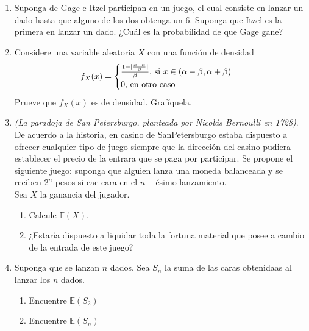 \documentclass[12pt,a4paper]{report}
\begin{document}
	\begin{enumerate}
		\item{
			Suponga de Gage e Itzel participan en un juego, el cual consiste en
			lanzar un dado hasta que alguno de los dos obtenga un 6. Suponga
			que Itzel es la primera en lanzar un dado. ¿Cuál es la probabilidad
			de que Gage gane?
		}

		\item{
			Considere una variable aleatoria $X$ con una función de densidad
			\[
				f_X(x) = \begin{cases}
					\frac{1-|\frac{x-\alpha}{\beta}|}{\beta},
					$ si $ x \in (\alpha - \beta, \alpha + \beta)\\
					0, $ en otro caso$
				\end{cases}
			\]
			Prueve que $f_X(x)$ es de densidad. Grafíquela.
		}

		\item{
			\textit{(La paradoja de San Petersburgo, planteada por Nicolás
			Bernoulli en 1728)}.\\
			De acuerdo a la historia, en casino de SanPetersburgo estaba
			dispuesto a ofrecer cualquier tipo de juego siempre que la
			dirección del casino pudiera establecer el precio de la entrara
			que se paga por participar. Se propone el siguiente juego: suponga
			que alguien lanza una moneda balanceada y se reciben $2^n$ pesos
			si cae cara en el $n-$ésimo lanzamiento.\\
			Sea $X$ la ganancia del jugador.
			\begin{enumerate}
				\item {
				Calcule $\mathbb{E}(X)$.
				}

				\item {
				¿Estaría dispuesto a liquidar toda la fortuna material que
				posee a cambio de la entrada de este juego?
				}
			\end{enumerate}
		}

		\item{
			Suponga que se lanzan $n$ dados. Sea $S_n$ la suma de las caras
			obtenidaas al lanzar los $n$ dados.
			\begin{enumerate}
				\item {
					Encuentre $\mathbb{E}(S_2)$
				}

				\item {
					Encuentre $\mathbb{E}(S_n)$
				}
			\end{enumerate}
		}


\end{enumerate}
\end{document}
